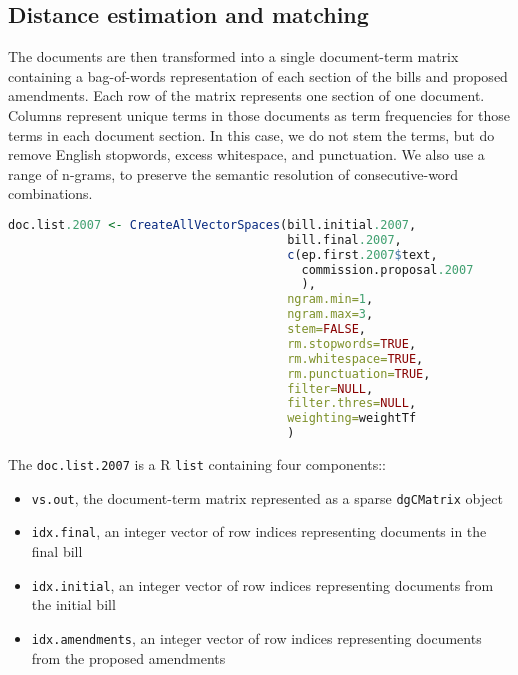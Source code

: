 \documentclass[11pt]{article}
\begin{document}
\subsection{Distance estimation and matching}
\label{sec:dist-estim-match}


The documents are then transformed into a single document-term
matrix containing a bag-of-words representation of each
section of the bills and proposed amendments. Each row of the matrix
represents one section of one document. Columns represent unique terms
in those documents as term frequencies for those terms in each
document section. In this case, we do not stem the terms, but do remove
English stopwords, excess whitespace, and punctuation. We also use
a range of n-grams, to preserve the semantic resolution of
consecutive-word combinations.

\begin{lstlisting}[language=R, numbers=none]
doc.list.2007 <- CreateAllVectorSpaces(bill.initial.2007,
                                       bill.final.2007,
                                       c(ep.first.2007$text,
                                         commission.proposal.2007
                                         ),
                                       ngram.min=1,
                                       ngram.max=3,
                                       stem=FALSE,
                                       rm.stopwords=TRUE,
                                       rm.whitespace=TRUE,
                                       rm.punctuation=TRUE,
                                       filter=NULL,
                                       filter.thres=NULL,
                                       weighting=weightTf
                                       )

\end{lstlisting}

The \texttt{doc.list.2007} is a R \texttt{list} containing four components::
\begin{itemize}
\item \texttt{vs.out}, the document-term matrix represented as a
  sparse \texttt{dgCMatrix} object \citep{Bates2012}
\item \texttt{idx.final}, an integer vector of row indices
  representing documents in the final bill
\item \texttt{idx.initial}, an integer vector of row indices
  representing documents from the initial bill
\item \texttt{idx.amendments}, an integer vector of row indices
  representing documents from the proposed amendments
\end{itemize} 
\end{document}
